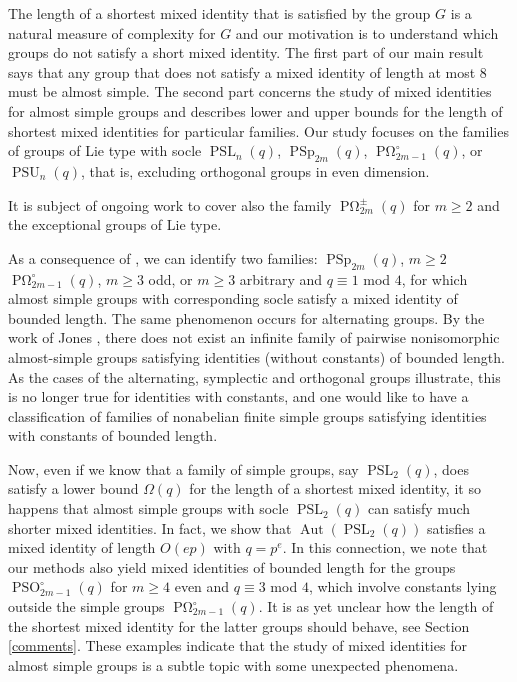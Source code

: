 \documentclass[a4paper,11pt]{amsproc}
\DeclareMathOperator{\PSp}{PSp}%
\DeclareMathOperator{\PSU}{PSU}%
\DeclareMathOperator{\PSO}{PSO}
\DeclareMathOperator{\POmega}{P\Omega}
\DeclareMathOperator{\Aut}{Aut}%
\DeclareMathOperator{\PSL}{PSL}%
\theoremstyle{plain}
\theoremstyle{definition}
\begin{document}
	The length of a shortest mixed identity that is satisfied by the group $G$ is a natural measure of complexity for $G$ and our motivation is to understand which groups do not satisfy a short mixed identity. The first part of our main result says that any group that does not satisfy a mixed identity of length at most $8$ must be almost simple. The second part concerns the study of mixed identities for almost simple groups and describes lower and upper bounds for the length of shortest
	mixed identities for particular families. Our study focuses on the families of groups of Lie type with socle $\PSL_n(q)$, $\PSp_{2m}(q)$, $\POmega_{2m-1}^\circ(q)$, or $\PSU_n(q)$, 
	that is, excluding orthogonal groups in even dimension.
	
	It is subject of ongoing work to cover also the family $\POmega_{2m}^\pm(q)$ for $m \geq 2$ and the exceptional groups of Lie type.
	
	As a consequence of \cite{tomanov1985generalized}, we can identify two families: $\PSp_{2m}(q)$, $m \geq 2$ $\POmega_{2m-1}^\circ(q)$, $m \geq 3$ odd, or $m \geq 3$ arbitrary and $q\equiv 1$ mod $4$, for which almost simple groups with corresponding socle satisfy a mixed identity of bounded length. The same phenomenon occurs for alternating groups. 
	By the work of Jones \cite{jones1974varieties}, there does not exist an infinite family of pairwise nonisomorphic almost-simple groups satisfying identities (without constants) of bounded length. As the cases of the alternating, symplectic and orthogonal groups illustrate, this is no longer true for identities with constants, and one would like to have a classification of families of nonabelian finite simple groups satisfying identities with constants of bounded length.
	
	Now, even if we know that a family of simple groups, say $\PSL_2(q)$, does satisfy a lower bound $\Omega(q)$ for the length of a shortest mixed identity, it so happens that almost simple groups with socle $\PSL_2(q)$ can satisfy much shorter mixed identities. In fact, we show that $\Aut(\PSL_2(q))$ satisfies a mixed identity of length $O(ep)$ with $q=p^e$. In this connection, 
	we note that our methods also yield mixed 
	identities of bounded length for the groups 
	$\PSO_{2m-1}^\circ(q)$ for $m \geq 4$ even and 
	$q \equiv 3$ mod $4$, 
	which involve constants 
	lying outside the simple groups $\POmega_{2m-1}^\circ(q)$. It is as yet unclear how the length of the shortest mixed identity for the latter groups should behave, see Section \ref{comments}. These examples indicate that the study of mixed identities for almost simple groups is a subtle topic with some unexpected phenomena. 
	
\end{document}
